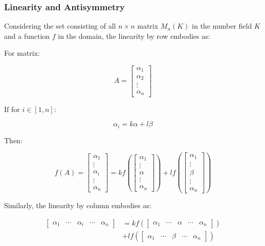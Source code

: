 \documentclass{article}
\begin{document}
\subsubsection{Linearity and Antisymmetry}

Considering the set consisting of all 
\(n \times n\) matrix \(M_n(K)\) in the number field \(K\) and
a function \(f\) in the domain,
the linearity by row embodies as:

For matrix:

\begin{equation*}
A=
\begin{bmatrix}
    \alpha_1 \\
    \alpha_2 \\
    \vdots \\
    \alpha_n
\end{bmatrix}
\end{equation*}

If for \(i \in [1, n]\):

\begin{equation*}
    \alpha_i=k\alpha+l\beta
\end{equation*}

Then:

\begin{equation}
f(A)=
\begin{bmatrix}
    \alpha_1 \\
    \vdots \\
    \alpha_i \\
    \vdots \\
    \alpha_n
\end{bmatrix} =
kf(
\begin{bmatrix}
    \alpha_1 \\
    \vdots \\
    \alpha \\
    \vdots \\
    \alpha_n
\end{bmatrix}) + lf(
\begin{bmatrix}
    \alpha_1 \\
    \vdots \\
    \beta \\
    \vdots \\
    \alpha_n
\end{bmatrix}
)
\end{equation}

Similarly, the linearity by column embodies as:

\begin{equation}
\begin{split}
\begin{bmatrix}
    \alpha_1 &
    \cdots &
    \alpha_i &
    \cdots &
    \alpha_n
\end{bmatrix} & =
kf(
\begin{bmatrix}
    \alpha_1 &
    \cdots &
    \alpha &
    \cdots &
    \alpha_n
\end{bmatrix}) \\
& + lf(
\begin{bmatrix}
    \alpha_1 &
    \cdots &
    \beta &
    \cdots &
    \alpha_n
\end{bmatrix}
)
\end{split}
\end{equation}
\end{document}
